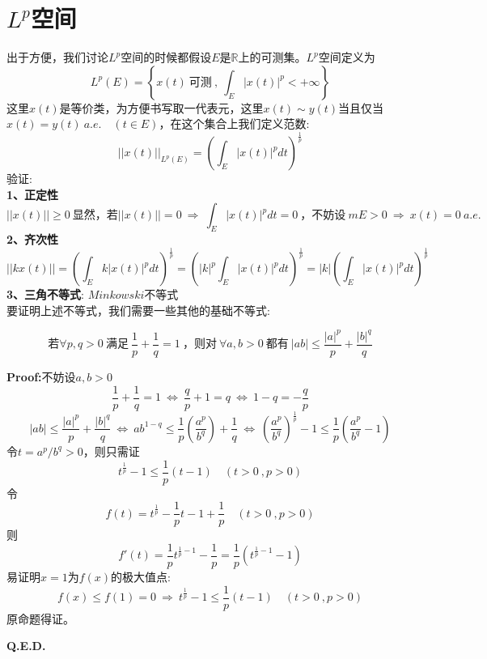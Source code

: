 \section{$L^p$空间} \label{lp}
出于方便，我们讨论$L^p$空间的时候都假设$E$是$\mathbb{R}$上的可测集。$L^p$空间定义为
\[L^p(E)=\left\{x(t) \ \text{可测} \ , \ \int_E|x(t)|^p<+\infty\right\}\]
这里$x(t)$是等价类，为方便书写取一代表元，这里$x(t) \sim y(t)$当且仅当$x(t)=y(t) \ a.e. \quad (t \in E)$，在这个集合上我们定义范数:
\[||x(t)||_{L^p(E)}=\left(\int_E|x(t)|^pdt\right)^{\frac{1}{p}}\]
验证:\\
\textbf{1、正定性}
\[||x(t)|| \geq 0 \ \text{显然，若}||x(t)||=0 \ \Rightarrow \ \int_E|x(t)|^pdt=0 \ \text{，不妨设} \ mE>0 \ \Rightarrow \ x(t)=0 \ a.e.\]
\textbf{2、齐次性}
\[||kx(t)||=\left(\int_Ek|x(t)|^pdt\right)^{\frac{1}{p}}=\left(|k|^p\int_E|x(t)|^pdt\right)^{\frac{1}{p}}=|k|\left(\int_E|x(t)|^pdt\right)^{\frac{1}{p}}\]
\textbf{3、三角不等式}: $Minkowski$不等式\\
要证明上述不等式，我们需要一些其他的基础不等式:
\begin{theorem}
    \[\text{若} \forall p,q>0 \ \text{满足} \ \frac{1}{p}+\frac{1}{q}=1 \ \text{，则对} \ \forall a,b>0 \ \text{都有} \ |ab| \leq \frac{|a|^p}{p}+\frac{|b|^q}{q}\]
\end{theorem}
\textbf{Proof:}不妨设$a,b>0$
\[\frac{1}{p}+\frac{1}{q}=1 \ \Leftrightarrow \ \frac{q}{p}+1=q \ \Leftrightarrow \ 1-q=-\frac{q}{p}\]
\[|ab| \leq \frac{|a|^p}{p}+\frac{|b|^q}{q} \ \Leftrightarrow \ ab^{1-q} \leq \frac{1}{p}\left(\frac{a^p}{b^q}\right)+\frac{1}{q} \ \Leftrightarrow \ \left(\frac{a^p}{b^q}\right)^{\frac{1}{p}}-1 \leq \frac{1}{p}\left(\frac{a^p}{b^q}-1\right)\]
令$t=a^p/b^q>0$，则只需证
\[t^{\frac{1}{p}}-1 \leq \frac{1}{p}(t-1) \quad (t>0 \ ,p>0)\]
令
\[f(t)=t^{\frac{1}{p}}-\frac{1}{p}t-1+\frac{1}{p} \quad (t>0 \ ,p>0)\]
则
\[f'(t)=\frac{1}{p}t^{\frac{1}{p}-1}-\frac{1}{p}=\frac{1}{p}\left(t^{\frac{1}{p}-1}-1\right)\]
易证明$x=1$为$f(x)$的极大值点:
\[f(x) \leq f(1)=0 \ \Rightarrow \ t^{\frac{1}{p}}-1 \leq \frac{1}{p}(t-1) \quad (t>0 \ ,p>0)\]
原命题得证。

\textbf{Q.E.D.}

